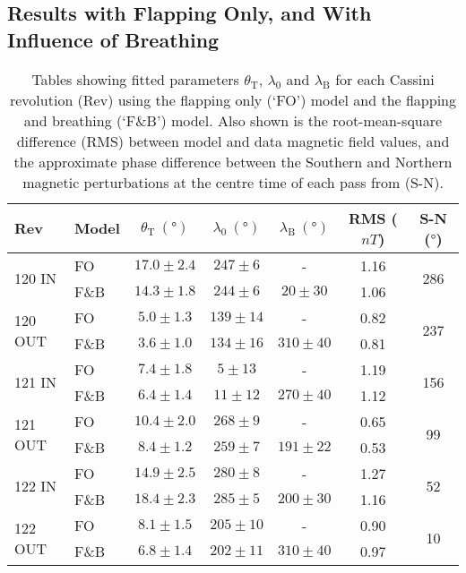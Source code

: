 \subsection{Results with Flapping Only, and With Influence of Breathing}
\begin{table}
\caption[Fitted parameters for FO and F{\&}B models, for \textit{Cassini} Revs 120-122.]{Tables showing fitted parameters $\theta_\mathrm{T}$, $\lambda_0$ and $\lambda_\mathrm{B}$ for each Cassini revolution (Rev) using the flapping only (`FO') model and the flapping and breathing (`F{\&}B') model. Also shown is the root-mean-square difference (RMS) between model and data magnetic field values, and the approximate phase difference between the Southern and Northern magnetic perturbations at the centre time of each pass from \citet{andrews2012} (S-N). }\label{equinox:table:fitparams}
\centering
\begin{tabular}{l l c c c c | c}
\hline
 Rev & Model & $\theta_\mathrm{T}~(\si\degree)$& $\lambda_0~(\si\degree)$ & $\lambda_\mathrm{B}~(\si\degree)$ & RMS ($\si{nT}$) & S-N ($\si{\degree}$) \\
\hline
\multirow{2}{*}{120 IN}  		& FO  		& $17.0\pm2.4$ 	& $247\pm6$ 	& -						& 1.16 	&	\multirow{2}{*}{286}\\
  											& F{\&}B  	& $14.3\pm1.8$ 	& $244\pm6$ 	& $20\pm30$ 	& 1.06	&\\  
\multirow{2}{*}{120 OUT}	& FO 		& $5.0\pm1.3$ 		& $139\pm14$ 	& - 						& 0.82	& \multirow{2}{*}{237}\\
 											& F{\&}B 	& $3.6\pm1.0$ 		& $134\pm16$ 	& $310\pm40$ 	& 0.81 &\\ 
\multirow{2}{*}{121 IN} 		& FO 		& $7.4\pm1.8$ 		& $5\pm13$ 		& - 						& 1.19 & \multirow{2}{*}{156} \\
  											& F{\&}B 	& $6.4\pm1.4$ 		& $11\pm12$ 	& $270\pm40$	& 1.12 & \\ 
\multirow{2}{*}{121 OUT}	& FO 		& $10.4\pm2.0$ 	& $268\pm9$ 	& -						& 0.65 & \multirow{2}{*}{99}\\
											& F{\&}B 	& $8.4\pm1.2$ 		& $259\pm7$ 	& $191\pm22$ 	& 0.53 & \\ 
\multirow{2}{*}{122 IN}		& FO 		& $14.9\pm2.5$ 	& $280\pm8$	& -						& 1.27 & \multirow{2}{*}{52} \\
											& F{\&}B 	& $18.4\pm2.3$ 	& $285\pm5$ 	& $200\pm30$ &	1.16 &\\ 
\multirow{2}{*}{122 OUT}	& FO 		& $8.1\pm1.5$ 		& $205\pm10$ & -					& 0.90	& \multirow{2}{*}{10}\\
											& F{\&}B 	& $6.8\pm1.4$ 	& $202\pm11$ 	& $310\pm40$		&	0.97 &\\
\hline
\end{tabular}
\end{table}
